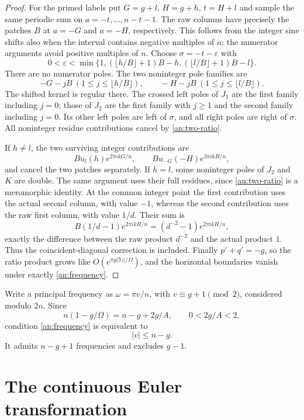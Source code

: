 \documentclass[11pt]{article}
\numberwithin{equation}{section}
\theoremstyle{definition}
\theoremstyle{remark}
\begin{document}
\begin{proof}
For the primed labels put $G=g+l$, $H=g+h$, $t=H+l$ and
sample the same periodic sum on $a=-t,\ldots,n-t-1$.
The raw columns have precisely the patches $B$ at $a=-G$ and
$a=-H$, respectively.  This follows from the integer sine shifts
also when the interval contains negative multiples of $n$;
the numerator arguments avoid positive multiples of $n$.
Choose $\sigma=-t-\varepsilon$ with
\[
 0<\varepsilon<\min\{1,(\lfloor h/B\rfloor+1)B-h,
                         (\lfloor l/B\rfloor+1)B-l\}.
\]
There are no numerator poles.  The two noninteger pole families are
\[
 -G-jB\ (1\le j\le\lfloor h/B\rfloor),\qquad
 -H-jB\ (1\le j\le\lfloor l/B\rfloor).
\]
The shifted kernel is regular there.  The crossed left poles of
$J_1$ are the first family including $j=0$; those of $J_2$ are
the first family with $j\ge1$ and the second family including
$j=0$.  Its other left poles are left of $\sigma$, and all right
poles are right of $\sigma$.  All noninteger residue contributions
cancel by \eqref{an:two-ratio}.

If $h\ne l$, the two surviving integer contributions are
\[
 B u_l(h)e^{2\pi ikG/n},\qquad
 B u_{-G}(-H)e^{2\pi ikH/n},
\]
and cancel the two patches separately.  If $h=l$, some noninteger
poles of $J_2$ and $K$ are double.  The same argument uses their
full residues, since \eqref{an:two-ratio} is a meromorphic identity.
At the common integer point the first contribution uses the actual
second column, with value $-1$, whereas the second contribution
uses the raw first column, with value $1/d$.  Their sum is
\[
 B(1/d-1)e^{2\pi ikH/n}=(d^{-2}-1)e^{2\pi ikH/n},
\]
exactly the difference between the raw product $d^{-2}$ and the
actual product $1$.  Thus the coincident-diagonal correction is
included.  Finally $p'+q'=-g$, so the ratio product grows like
$O(e^{\pi g|\Im z|/\Omega})$, and the horizontal boundaries vanish
under exactly \eqref{an:frequency}.
\end{proof}

Write a principal frequency as $\omega=\pi v/n$, with
$v\equiv g+1\pmod2$, considered modulo $2n$.  Since
\[
 n(1-g/\Omega)=n-g+2g/A,\qquad 0<2g/A<2,
\]
condition \eqref{an:frequency} is equivalent to
\begin{equation}
 |v|\le n-g.
 \label{an:admitted-set}
\end{equation}
It admits $n-g+1$ frequencies and excludes $g-1$.

\section{The continuous Euler transformation}
\label{an:euler-section}
\end{document}
